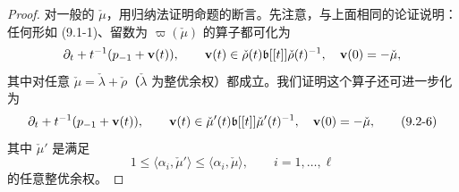 \begin{proof}
对一般的 $\check\mu$，用归纳法证明命题的断言。先注意，与上面相同的论证说明：任何形如 (9.1-1)、留数为 $\varpi(\check\mu)$ 的算子都可化为
\[
\partial_t + t^{-1}(p_{-1}+\mathbf{v}(t)),\qquad
\mathbf{v}(t)\in\check\rho(t)\mathfrak{b}[[t]]\check\rho(t)^{-1},\quad \mathbf{v}(0)=-\check\mu,
\]
其中对任意 $\check\mu=\check\lambda+\check\rho$（$\check\lambda$ 为整优余权）都成立。我们证明这个算子还可进一步化为
\begin{equation}
\partial_t + t^{-1}(p_{-1}+\mathbf{v}(t)),\qquad
\mathbf{v}(t)\in\check\mu'(t)\mathfrak{b}[[t]]\check\mu'(t)^{-1},\quad \mathbf{v}(0)=-\check\mu,
\tag{9.2-6}
\end{equation}
其中 $\check\mu'$ 是满足
\begin{equation}
1\le\langle\alpha_i,\check\mu'\rangle\le\langle\alpha_i,\check\mu\rangle,\qquad i=1,\dots,\ell
\tag{9.2-7}
\end{equation}
的任意整优余权。



\end{proof}

